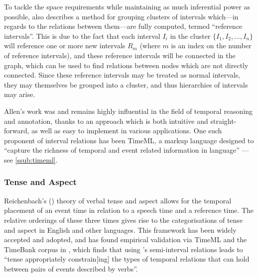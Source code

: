 \documentclass[a4paper,12pt,leqno]{article}
\newcommand{\nb}[1]{{\color{red}[NB\footnote{{\color{red}#1}}]}}
\begin{document}
To tackle the space requirements while maintaining as much inferential power as possible, \citet[p. 838]{allen1983maintaining} also describes a method for grouping clusters of intervals which---in regards to the relations between them---are fully computed, termed ``reference intervals''. This is due to the fact that each interval $I_i$ in the cluster $\{I_1, I_2, ..., I_n\}$ will reference one or more new intervals $R_m$ (where $m$ is an index on the number of reference intervals), and these reference intervals will be connected in the graph, which can be used to find relations between nodes which are not directly connected. Since these reference intervals may be treated as normal intervals, they may themselves be grouped into a cluster, and thus hierarchies of intervals may arise.%

Allen's work was and remains highly influential in the field of temporal reasoning and annotation, thanks to an approach which is both intuitive and straight-forward, as well as easy to implement in various applications. One such proponent of interval relations has been TimeML, a markup language designed to ``capture the richness of temporal and event related information in language'' \citep[p. 123]{Pustejovsky2005}---see \cref{ssub:timeml}.


\subsubsection{Tense and Aspect}\label{ssub:tenseaspect}
Reichenbach's (\citeyear{reichenbach1947elements}) theory of verbal tense and aspect allows for the temporal placement of an event time in relation to a speech time and a reference time. The relative orderings of these three times gives rise to the categorisations of tense and aspect in English and other languages. This framework has been widely accepted and adopted, and has found empirical validation via TimeML \citep{timeml2005timeml} and the TimeBank corpus \citep{pustejovsky2003timebank} in \citet{Derczynski2013}, which finds that using \citet{Freksa1992}'s semi-interval relations leads to ``tense appropriately constrain[ing] the types of temporal relations that can hold between pairs of events described by verbs''.

\end{document}
